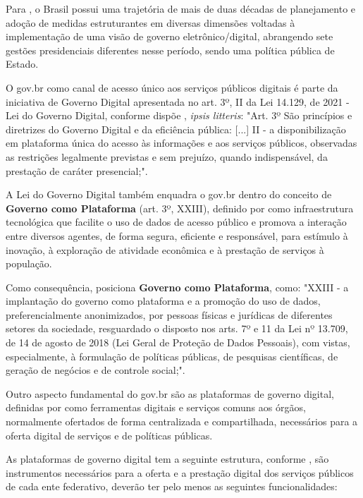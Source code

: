 Para \cite{mitkiewicz2024transformaccao}, o Brasil possui uma trajetória de mais de duas décadas de planejamento e adoção de medidas estruturantes em diversas dimensões voltadas à implementação de uma visão de governo eletrônico/digital, abrangendo sete gestões presidenciais diferentes nesse período, sendo uma política pública de Estado.

O gov.br como canal de acesso único aos serviços públicos digitais é parte da iniciativa de Governo Digital apresentada no art. 3º, II da Lei 14.129, de 2021 - Lei do Governo Digital, conforme dispõe \cite{l14129}, \textit{ipsis litteris}: "Art. 3º  São princípios e diretrizes do Governo Digital e da eficiência pública: [...] II - a disponibilização em plataforma única do acesso às informações e aos serviços públicos, observadas as restrições legalmente previstas e sem prejuízo, quando indispensável, da prestação de caráter presencial;".

A Lei do Governo Digital também enquadra o gov.br dentro do conceito de \textbf{Governo como Plataforma} (art. 3º, XXIII), definido por \cite{l14129} como infraestrutura tecnológica que facilite o uso de dados de acesso público e promova a interação entre diversos agentes, de forma segura, eficiente e responsável, para estímulo à inovação, à exploração de atividade econômica e à prestação de serviços à população.

Como consequência, \cite{l14129} posiciona \textbf{Governo como Plataforma}, como: "XXIII - a implantação do governo como plataforma e a promoção do uso de dados, preferencialmente anonimizados, por pessoas físicas e jurídicas de diferentes setores da sociedade, resguardado o disposto nos arts. 7º e 11 da Lei nº 13.709, de 14 de agosto de 2018 (Lei Geral de Proteção de Dados Pessoais), com vistas, especialmente, à formulação de políticas públicas, de pesquisas científicas, de geração de negócios e de controle social;".

Outro aspecto fundamental do gov.br são as plataformas de governo digital, definidas por \cite{l14129} como ferramentas digitais e serviços comuns aos órgãos, normalmente ofertados de forma centralizada e compartilhada, necessários para a oferta digital de serviços e de políticas públicas. 

As plataformas de governo digital tem a seguinte estrutura, conforme \cite{l14129}, são instrumentos necessários para a oferta e a prestação digital dos serviços públicos de cada ente federativo, deverão ter pelo menos as seguintes funcionalidades: 

